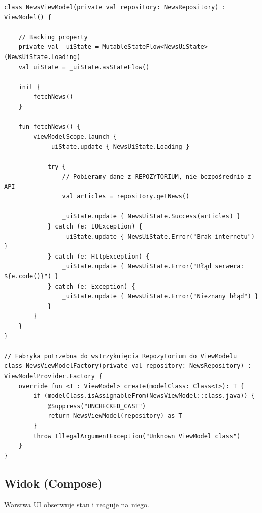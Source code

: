 \begin{verbatim}
class NewsViewModel(private val repository: NewsRepository) : ViewModel() {

    // Backing property
    private val _uiState = MutableStateFlow<NewsUiState>(NewsUiState.Loading)
    val uiState = _uiState.asStateFlow()

    init {
        fetchNews()
    }

    fun fetchNews() {
        viewModelScope.launch {
            _uiState.update { NewsUiState.Loading }
            
            try {
                // Pobieramy dane z REPOZYTORIUM, nie bezpośrednio z API
                val articles = repository.getNews()
                
                _uiState.update { NewsUiState.Success(articles) }
            } catch (e: IOException) {
                _uiState.update { NewsUiState.Error("Brak internetu") }
            } catch (e: HttpException) {
                _uiState.update { NewsUiState.Error("Błąd serwera: ${e.code()}") }
            } catch (e: Exception) {
                _uiState.update { NewsUiState.Error("Nieznany błąd") }
            }
        }
    }
}

// Fabryka potrzebna do wstrzyknięcia Repozytorium do ViewModelu
class NewsViewModelFactory(private val repository: NewsRepository) : ViewModelProvider.Factory {
    override fun <T : ViewModel> create(modelClass: Class<T>): T {
        if (modelClass.isAssignableFrom(NewsViewModel::class.java)) {
            @Suppress("UNCHECKED_CAST")
            return NewsViewModel(repository) as T
        }
        throw IllegalArgumentException("Unknown ViewModel class")
    }
}
\end{verbatim}

\subsection{Widok (Compose)}

Warstwa UI obserwuje stan i reaguje na niego.

